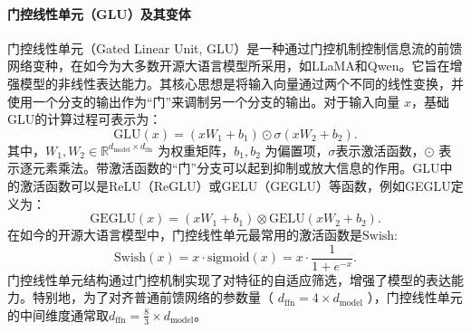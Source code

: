 \paragraph{门控线性单元（GLU）及其变体}
门控线性单元（Gated Linear Unit, GLU）\cite{Shazeer2020GLUVI}是一种通过门控机制控制信息流的前馈网络变种，在如今为大多数开源大语言模型所采用，如LLaMA\cite{Touvron2023LLaMAOA}和Qwen\cite{Bai2023QwenTR}。它旨在增强模型的非线性表达能力。其核心思想是将输入向量通过两个不同的线性变换，并使用一个分支的输出作为“门”来调制另一个分支的输出。对于输入向量 $x$，基础GLU的计算过程可表示为：
\begin{equation}
\text{GLU}(x) = (xW_1 + b_1) \odot \sigma(xW_2 + b_2).
\end{equation}
其中，$W_1, W_2 \in \mathbb{R}^{d_{\text{model}} \times d_{\text{ffn}}}$ 为权重矩阵，$b_1, b_2$ 为偏置项，$\sigma$表示激活函数，$\odot$ 表示逐元素乘法。带激活函数的“门”分支可以起到抑制或放大信息的作用。GLU中的激活函数可以是ReLU（ReGLU）或GELU（GEGLU）等函数，例如GEGLU定义为：
\begin{equation}
\text{GEGLU}(x) = (xW_1 + b_1) \otimes \text{GELU}(xW_2 + b_2).
\end{equation}
在如今的开源大语言模型中，门控线性单元最常用的激活函数是$\text{Swish}$:
\begin{equation}
    \text{Swish}(x) =  x\cdot \text{sigmoid}(x) = x\cdot\frac{1}{1+e^{-x}}.
\end{equation}
门控线性单元结构通过门控机制实现了对特征的自适应筛选，增强了模型的表达能力。特别地，为了对齐普通前馈网络的参数量（ $d_{\text{ffn}} = 4 \times d_{\text{model}}$ ），门控线性单元的中间维度通常取$d_{\text{ffn}} = \frac{8}{3} \times d_{\text{model}}$。

